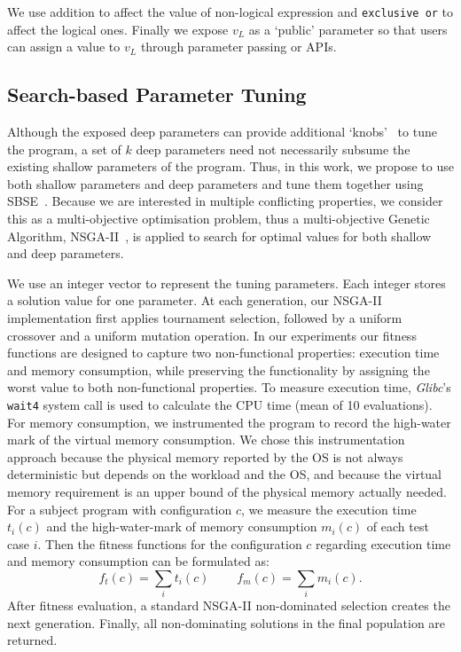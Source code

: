 We use addition to affect the value of non-logical expression and \texttt{exclusive or} to affect the logical ones.
Finally we expose $v_L$ as a `public' parameter so that users can assign a value to $v_L$ through parameter passing or APIs.
\vspace{-0.2em}
\subsection{Search-based Parameter Tuning}
\label{sec_nsgaii}

Although the exposed deep parameters can provide additional `knobs'~\cite{Hoffmann:2011:DKR:1950365.1950390} to tune the program, a set of $k$ deep parameters need not necessarily subsume the existing shallow parameters of the program.  Thus, in this work, we propose to use both shallow parameters and deep parameters and tune them together using SBSE~\cite{Harman:2007:CSF:1253532.1254729}. Because we are interested in multiple conflicting properties, we consider this as a multi-objective optimisation problem, thus a multi-objective Genetic Algorithm, NSGA-II~\cite{996017}, is applied to search for optimal values for both shallow and deep parameters.

We use an integer vector to represent the tuning parameters. Each integer stores a solution value for one parameter. At each generation, our NSGA-II implementation first applies tournament selection, followed by a uniform crossover and a uniform mutation operation. In our experiments our fitness functions are designed to capture two non-functional properties: execution time and memory consumption, while preserving the functionality by assigning the worst value to both non-functional properties. To measure execution time, \emph{Glibc}'s \texttt{wait4} system call is used to calculate the CPU time (mean of 10 evaluations). For memory consumption, we instrumented the program to record the high-water mark of the virtual memory consumption. We chose this instrumentation approach because the physical memory reported by the OS is not always deterministic but depends on the workload and the OS, and because the virtual memory requirement is an upper bound of the physical memory actually needed. For a subject program with configuration $c$, we measure the execution time $t_i(c)$ and the high-water-mark of memory consumption $m_i(c)$ of each test case $i$. Then the fitness functions for the configuration $c$ regarding execution time and memory consumption can be formulated as:
$$f_t(c)=\sum_{i} t_i(c) ~~~~~~~~~~f_m(c)=\sum_{i} m_i(c).$$
After fitness evaluation, a standard NSGA-II non-dominated selection creates the next generation. Finally, all non-dominating solutions in the final population are returned.
